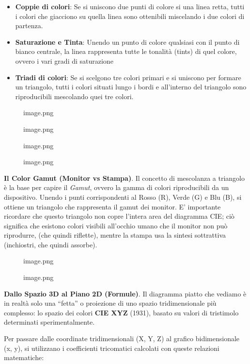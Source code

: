 \documentclass[
]{article}
\providecommand{\tightlist}{%
  \setlength{\itemsep}{0pt}\setlength{\parskip}{0pt}}
\begin{document}
\begin{itemize}
\tightlist
\item
  \textbf{Coppie di colori}: Se si uniscono due punti di colore si una linea retta, tutti i colori che giacciono su quella linea sono ottenibili miscelando i due colori di partenza.
\item
  \textbf{Saturazione e Tinta}: Unendo un punto di colore qualsiasi con il punto di bianco centrale, la linea rappresenta tutte le tonalità (tints) di quel colore, ovvero i vari gradi di saturazione
\item
  \textbf{Triadi di colori}: Se si scelgono tre colori primari e si uniscono per formare un triangolo, tutti i colori situati lungo i bordi e all'interno del triangolo sono riproducibili mescolando quei tre colori.
\end{itemize}

\begin{figure}
\centering
{image.png}
\caption{image.png}
\end{figure}

\begin{figure}
\centering
{image.png}
\caption{image.png}
\end{figure}

\textbf{Il Color Gamut (Monitor vs Stampa)}.
Il concetto di mescolanza a triangolo è la base per capire il \emph{Gamut}, ovvero la gamma di colori riproducibili da un dispositivo. Unendo i punti corrispondenti al Rosso (R), Verde (G) e Blu (B), si ottiene un triangolo che rappresenta il gamut dei monitor. E' importante ricordare che questo triangolo non copre l'intera area del diagramma CIE; ciò significa che esistono colori visibili all'occhio umano che il monitor non può riprodurre, (che quindi riflette), mentre la stampa usa la sintesi sottrattiva (inchiostri, che quindi assorbe).

\begin{figure}
\centering
{image.png}
\caption{image.png}
\end{figure}

\textbf{Dallo Spazio 3D al Piano 2D (Formule)}.
Il diagramma piatto che vediamo è in realtà solo una ``fetta'' o proiezione di uno spazio tridimensionale più complesso: lo spazio dei colori \textbf{CIE XYZ} (1931), basato su valori di tristimolo determinati sperimentalmente.

Per passare dalle coordinate tridimensionali (X, Y, Z) al grafico bidimensionale (x, y), si utilizzano i coefficienti tricomatici calcolati con queste relazioni matematiche:
\end{document}
